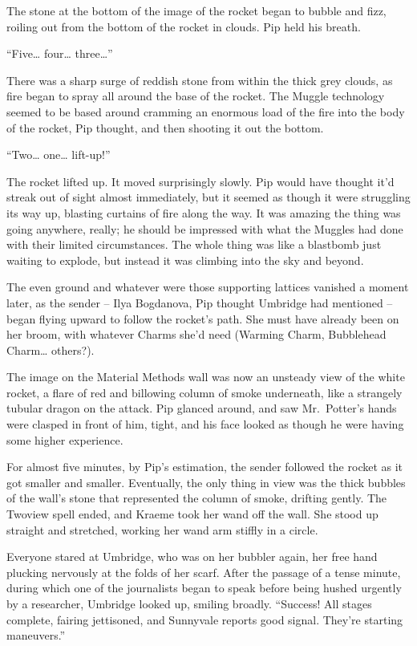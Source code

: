 The stone at the bottom of the image of the rocket began to bubble and
fizz, roiling out from the bottom of the rocket in clouds. Pip held his
breath.

``Five\ldots{} four\ldots{} three\ldots{}''

There was a sharp surge of reddish stone from within the thick grey
clouds, as fire began to spray all around the base of the rocket. The
Muggle technology seemed to be based around cramming an enormous load of
the fire into the body of the rocket, Pip thought, and then shooting it
out the bottom.

``Two\ldots{} one\ldots{} lift-up!''

The rocket lifted up. It moved surprisingly slowly. Pip would have
thought it'd streak out of sight almost immediately, but it seemed as
though it were struggling its way up, blasting curtains of fire along
the way. It was amazing the thing was going anywhere, really; he should
be impressed with what the Muggles had done with their limited
circumstances. The whole thing was like a blastbomb just waiting to
explode, but instead it was climbing into the sky and beyond.

The even ground and whatever were those supporting lattices vanished a
moment later, as the sender -- Ilya Bogdanova, Pip thought Umbridge had
mentioned -- began flying upward to follow the rocket's path. She must
have already been on her broom, with whatever Charms she'd need (Warming
Charm, Bubblehead Charm\ldots{} others?).

The image on the Material Methods wall was now an unsteady view of the
white rocket, a flare of red and billowing column of smoke underneath,
like a strangely tubular dragon on the attack. Pip glanced around, and
saw Mr.~Potter's hands were clasped in front of him, tight, and his face
looked as though he were having some higher experience.

For almost five minutes, by Pip's estimation, the sender followed the
rocket as it got smaller and smaller. Eventually, the only thing in view
was the thick bubbles of the wall's stone that represented the column of
smoke, drifting gently. The Twoview spell ended, and Kraeme took her
wand off the wall. She stood up straight and stretched, working her wand
arm stiffly in a circle.

Everyone stared at Umbridge, who was on her bubbler again, her free hand
plucking nervously at the folds of her scarf. After the passage of a
tense minute, during which one of the journalists began to speak before
being hushed urgently by a researcher, Umbridge looked up, smiling
broadly. ``Success! All stages complete, fairing jettisoned, and
Sunnyvale reports good signal. They're starting maneuvers.''

